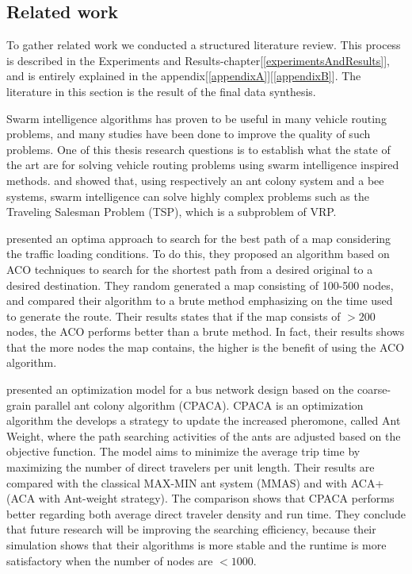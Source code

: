 \subsection{Related work}

To gather related work we conducted a structured literature review. This process is described in the Experiments and Results-chapter[\ref{experimentsAndResults}], and is entirely explained in the appendix[\ref{appendixA}][\ref{appendixB}]. The literature in this section is the result of the final data synthesis. \newline

Swarm intelligence algorithms has proven to be useful in many vehicle routing problems, and many studies have been done to improve the quality of such problems. One of this thesis research questions is to establish what the state of the art are for solving vehicle routing problems using swarm intelligence inspired methods. \citet{dorigo97} and \citet{lucic03} showed that, using respectively an ant colony system and a bee systems, swarm intelligence can solve highly complex problems such as the Traveling Salesman Problem (TSP), which is a subproblem of VRP. 

\citet{hsiao04} presented an optima approach to search for the best path of a map considering the traffic loading conditions. To do this, they proposed an algorithm based on ACO techniques to search for the shortest path from a desired original to a desired destination. They random generated a map consisting of 100-500 nodes, and compared their algorithm to a brute method emphasizing on the time used to generate the route. Their results states that if the map consists of $>200$ nodes, the ACO performs better than a brute method. In fact, their results shows that the more nodes the map contains, the higher is the benefit of using the ACO algorithm. 

\citet{yang07} presented an optimization model for a bus network design based on the coarse-grain parallel ant colony algorithm (CPACA). CPACA is an optimization algorithm the develops a strategy to update the increased pheromone, called Ant Weight, where the path searching activities of the ants are adjusted based on the objective function. The model aims to minimize the average trip time by maximizing the number of direct travelers per unit length. Their results are compared with the classical MAX-MIN ant system (MMAS)\citep{stutzle99} and with ACA+ (ACA with Ant-weight strategy). The comparison shows that CPACA performs better regarding both average direct traveler density and run time. They conclude that future research will be improving the searching efficiency, because their simulation shows that their algorithms is more stable and the runtime is more satisfactory when the number of nodes are $<1000$. 

